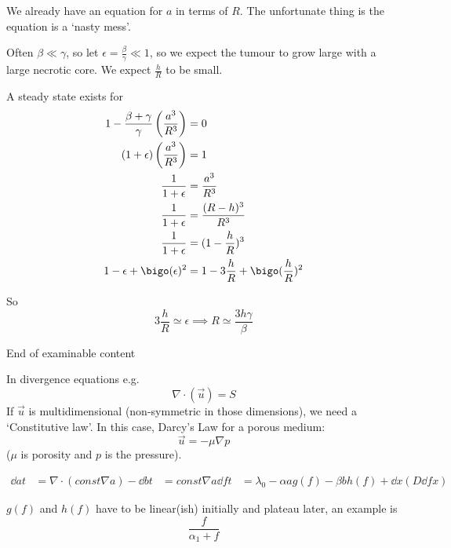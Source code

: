 \documentclass{X:/Documents/Coding/Latex/myassignment}
\begin{document}
We already have an equation for $a$ in terms of $R$. The unfortunate thing is the equation is a `nasty mess'.

Often $\beta \ll \gamma$, so let $\epsilon = \frac \beta \gamma \ll 1$, so we expect the tumour to grow large with a large necrotic core. We expect $\frac{h}{R}$ to be small.

A steady state exists for
\begin{align*}
	1 - \frac{\beta + \gamma}{\gamma} \left(\frac{a^3}{R^3}\right) &= 0\\
	(1 + \epsilon)\left(\frac{a^3}{R^3}\right) &= 1\\
	\frac{1}{1+\epsilon} &= \frac{a^3}{R^3}\\
	\frac{1}{1+\epsilon} &= \frac{(R-h)^3}{R^3}\\
	\frac{1}{1+\epsilon} &= (1-\frac{h}{R})^3\\
	1 - \epsilon + \bigo(\epsilon)^2 &= 1 - 3\frac{h}{R} + \bigo(\frac{h}{R})^2
\end{align*}

So 
\[3\frac{h}{R} \simeq \epsilon \implies R \simeq \frac{3h \gamma}{\beta}\]



End of examinable content


In divergence equations e.g.
\[\nabla \cdot (\vec u) = S\]
If $\vec u$ is multidimensional (non-symmetric in those dimensions), we need a `Constitutive law'. In this case, Darcy's Law for a porous medium:
\[\vec u = - \mu \nabla p\]
($\mu$ is porosity and $p$ is the pressure).






\begin{align*}
	\dd at &= \nabla\cdot (const \nabla a) - 
	\dd bt &= const \nabla a
	\dd ft &= \lambda_0 - \alpha a g(f) - \beta b h(f) + \dd{}x\left(D \dd fx\right)
\end{align*}

$g(f)$ and $h(f)$ have to be linear(ish) initially and plateau later, an example is
\[\frac{f}{\alpha_1 + f}\]
\end{document}
